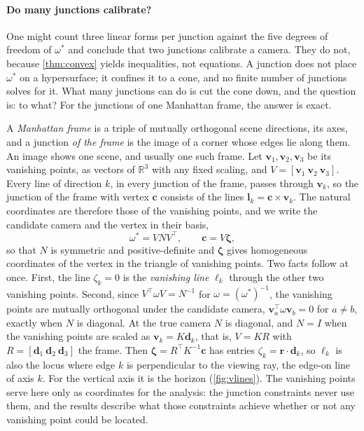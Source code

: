 \documentclass[pdflatex,sn-mathphys-num,iicol]{sn-jnl}
\newcommand{\vd}{\mathbf{d}}
\newcommand{\vr}{\mathbf{r}}
\newcommand{\vl}{\mathbf{l}}
\newcommand{\vc}{\mathbf{c}}
\newcommand{\vv}{\mathbf{v}}
\theoremstyle{thmstyleone}
\theoremstyle{thmstylethree}
\theoremstyle{thmstyletwo}
\begin{document}
\paragraph{Do many junctions calibrate?} One might count three linear forms per junction against the five degrees of freedom of $\omega^{*}$ and conclude that two junctions calibrate a camera. They do not, because \cref{thm:convex} yields inequalities, not equations. A junction does not place $\omega^{*}$ on a hypersurface; it confines it to a cone, and no finite number of junctions solves for it. What many junctions can do is cut the cone down, and the question is: to what? For the junctions of one Manhattan frame, the answer is exact.

A \emph{Manhattan frame} is a triple of mutually orthogonal scene directions, its axes, and a junction \emph{of the frame} is the image of a corner whose edges lie along them. An image shows one scene, and usually one such frame. Let $\vv_1,\vv_2,\vv_3$ be its vanishing points, as vectors of $\mathbb R^3$ with any fixed scaling, and $V=[\vv_1\ \vv_2\ \vv_3]$. Every line of direction $k$, in every junction of the frame, passes through $\vv_k$, so the junction of the frame with vertex $\vc$ consists of the lines $\vl_k=\vc\times\vv_k$. The natural coordinates are therefore those of the vanishing points, and we write the candidate camera and the vertex in their basis,
\begin{equation}
\omega^{*}=VNV^{\top},\qquad \vc=V\boldsymbol\zeta ,
\label{eq:vpbasis}
\end{equation}
so that $N$ is symmetric and positive-definite and $\boldsymbol\zeta$ gives homogeneous coordinates of the vertex in the triangle of vanishing points. Two facts follow at once. First, the line $\zeta_k=0$ is the \emph{vanishing line} $\ell_k$ through the other two vanishing points. Second, since $V^{\top}\omega V=N^{-1}$ for $\omega=(\omega^{*})^{-1}$, the vanishing points are mutually orthogonal under the candidate camera, $\vv_a^{\top}\omega\vv_b=0$ for $a\neq b$, exactly when $N$ is diagonal. At the true camera $N$ is diagonal, and $N=I$ when the vanishing points are scaled as $\vv_k=K\vd_k$, that is, $V=KR$ with $R=[\vd_1\ \vd_2\ \vd_3]$ the frame. Then $\boldsymbol\zeta=R^{\top}K^{-1}\vc$ has entries $\zeta_k=\vr\cdot\vd_k$, so $\ell_k$ is also the locus where edge $k$ is perpendicular to the viewing ray, the edge-on line of axis $k$. For the vertical axis it is the horizon (\cref{fig:vlines}). The vanishing points serve here only as coordinates for the analysis: the junction constraints never use them, and the results describe what those constraints achieve whether or not any vanishing point could be located.
\end{document}
